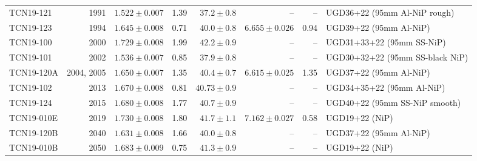 \documentclass[10pt,letterpaper]{article}
\begin{document}
\begin{table}
\begin{tabular}{l r r r r r r l}
TCN19-121 & 1991 & $1.522 \pm 0.007$ & 1.39 & $37.2 \pm 0.8$ & -- & -- & UGD36+22 (95mm Al-NiP rough) \\
TCN19-123 & 1994 & $1.645 \pm 0.008$ & 0.71 & $40.0 \pm 0.8$ & $6.655 \pm 0.026$ & 0.94 & UGD39+22 (95mm Al-NiP) \\
TCN19-100 & 2000 & $1.729 \pm 0.008$ & 1.99 & $42.2 \pm 0.9$ & -- & -- & UGD31+33+22 (95mm SS-NiP) \\
TCN19-101 & 2002 & $1.536 \pm 0.007$ & 0.85 & $37.9 \pm 0.8$ & -- & -- & UGD30+32+22 (95mm SS-black NiP) \\
TCN19-120A & 2004, 2005 & $1.650 \pm 0.007$ & 1.35 & $40.4 \pm 0.7$ & $6.615 \pm 0.025$ & 1.35 & UGD37+22 (95mm Al-NiP) \\
TCN19-102 & 2013 & $1.670 \pm 0.008$ & 0.81 & $40.73 \pm 0.9$ & -- & -- & UGD34+35+22 (95mm Al-NiP) \\
TCN19-124 & 2015 & $1.680 \pm 0.008$ & 1.77 & $40.7 \pm 0.9$ & -- & -- & UGD40+22 (95mm SS-NiP smooth) \\
TCN19-010E & 2019 & $1.730 \pm 0.008$ & 1.80 & $41.7 \pm 1.1$ & $7.162 \pm 0.027$ & 0.58 & UGD19+22 (NiP) \\
TCN19-120B & 2040 & $1.631 \pm 0.008$ & 1.66 & $40.0 \pm 0.8$ & -- & -- & UGD37+22 (95mm Al-NiP) \\
TCN19-010B & 2050 & $1.683 \pm 0.009$ & 0.75 & $41.3 \pm 0.9$ & -- & -- & UGD19+22 (NiP) \\
\bottomrule
\end{tabular}
\label{tab:transmission}
\end{table}
\end{document}
